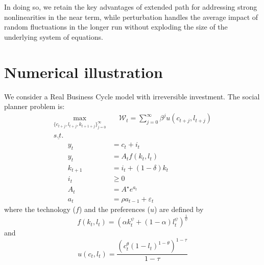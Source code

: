 \documentclass[a4paper,11pt]{amsart}
\begin{document}
In doing so, we retain the key advantages of extended path for addressing strong
nonlinearities in the near term, while perturbation handles the average impact
of random fluctuations in the longer run without exploding the size of the
underlying system of equations.

\section{Numerical illustration}\label{sec:3}

We consider a Real Business Cycle model with irreversible investment. The social planner problem is:
\begin{equation*}
   \begin{split}
      \max_{\{c_{t+j},l_{t+j},k_{t+1+j}\}_{j=0}^{\infty}} & \quad \mathcal W_t = \sum_{j=0}^{\infty}\beta^ju(c_{t+j},l_{t+j}) \\
      \underline{s.t.}                                    &                                                                   \\
      \qquad y_t                                          & = c_t + i_t                                                       \\
      \qquad y_t                                          & = A_tf(k_t,l_t)                                                   \\
      \qquad k_{t+1}                                      & = i_t + (1-\delta)k_t                                             \\
      \qquad i_t                                          & \geq 0                                                            \\
      \qquad A_{t}                                        & = {A^{\star}}e^{a_{t}}                                            \\
      \qquad a_{t}                                        & = \rho a_{t-1} + \varepsilon_t
   \end{split}
\end{equation*}
where the technology ($f$) and the preferences ($u$) are defined by
\begin{equation*}
   f(k_t,l_t) = \left(\alpha k_t^{\psi} + (1-\alpha)l_t^{\psi}\right)^{\frac{1}{\psi}}
\end{equation*}
and
\begin{equation*}
   u(c_t,l_t) = \frac{\left(c_t^{\theta}(1-l_t)^{1-\theta}\right)^{1-\tau}}{1-\tau}
\end{equation*}
\end{document}
